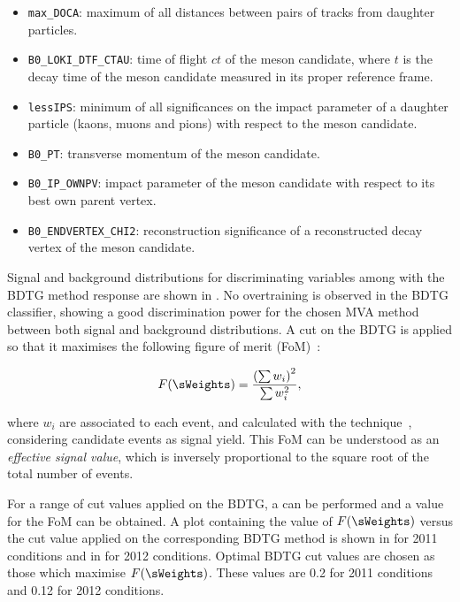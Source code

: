 \begin{itemize}
\item{} \texttt{max\_DOCA}: maximum of all distances between pairs of tracks from daughter particles.
\item{} \texttt{B0\_LOKI\_DTF\_CTAU}: time of flight $ct$ of the \Bs meson candidate, where
$t$ is the decay time of the \Bs meson candidate measured in its proper reference frame.
\item{} \texttt{lessIPS}: minimum of all significances on the impact parameter of a daughter particle (kaons, muons and pions) with respect to the \Bs meson candidate.
\item{} \texttt{B0\_PT}: transverse momentum of the \Bs meson candidate.
\item{} \texttt{B0\_IP\_OWNPV}: impact parameter of the \Bs meson candidate with respect to its best own parent vertex.
\item{} \texttt{B0\_ENDVERTEX\_CHI2}: reconstruction significance of a reconstructed decay vertex of the \Bs meson candidate.
\end{itemize}

Signal and background distributions for discriminating variables among with the BDTG method response are shown in .
No overtraining is observed in the BDTG classifier, showing a good discrimination power for the chosen MVA method between both signal
and background distributions. A cut on the BDTG is applied so that it maximises the following figure of merit (FoM)~\cite{Yuehong_fom}:

\begin{equation}
\label{eqn:fom}
F(\sWeights) = \frac{\left(\sum{w_{i}}\right)^2}{\sum{w_{i}^2}},
\end{equation}

\noindent where $w_i$ are \sWeights associated to each event, and calculated with the \sPlot technique~\cite{splot}, considering \Bs candidate events as signal yield. 
This FoM can be understood as an {\it{effective signal value}}, which is inversely proportional to the square root of the total number of events. 

For a range of cut values applied on the BDTG, a \sPlot can be performed and a value for the FoM can be obtained. A plot containing
the value of $F(\sWeights)$ versus the cut value applied on the corresponding BDTG method is shown in 
for 2011 conditions and in  for 2012 conditions. Optimal BDTG cut values are chosen as those which maximise $F(\sWeights)$. 
These values are 0.2 for 2011 conditions and 0.12 for 2012 conditions.

